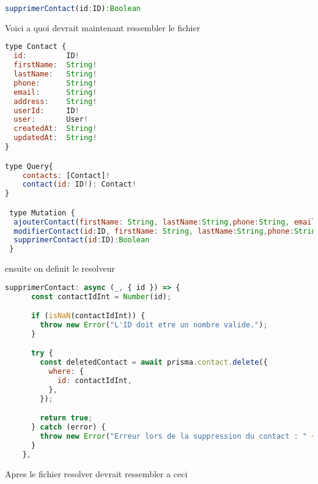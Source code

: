 \documentclass{article}
\begin{document}
\begin{lstlisting}[language=JavaScript]
  supprimerContact(id:ID):Boolean
 \end{lstlisting}
Voici a quoi devrait maintenant ressembler le fichier 




\begin{lstlisting}[language=JavaScript]
type Contact {
  id:         ID!       
  firstName:  String!   
  lastName:   String!    
  phone:      String!   
  email:      String!   
  address:    String!  
  userId:     ID!       
  user:       User!      
  createdAt:  String! 
  updatedAt:  String! 
}

type Query{
    contacts: [Contact]!
    contact(id: ID!): Contact!
}

 type Mutation {    
  ajouterContact(firstName: String, lastName:String,phone:String, email:String, address:String, userId:String):Contact,
  modifierContact(id:ID, firstName: String, lastName:String,phone:String, email:String, address:String, userId:String):Contact,
  supprimerContact(id:ID):Boolean
 }

 \end{lstlisting}

ensuite on definit le resolveur 


\begin{lstlisting}[language=JavaScript]
supprimerContact: async (_, { id }) => {
      const contactIdInt = Number(id);

      if (isNaN(contactIdInt)) {
        throw new Error("L'ID doit etre un nombre valide.");
      }

      try {
        const deletedContact = await prisma.contact.delete({
          where: {
            id: contactIdInt,
          },
        });

        return true;
      } catch (error) {
        throw new Error("Erreur lors de la suppression du contact : " + error.message);
      }
    },
    \end{lstlisting}

Apres le fichier resolver devrait ressembler a ceci
\end{document}

